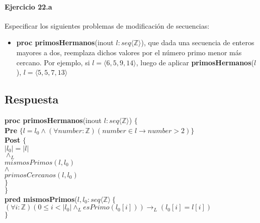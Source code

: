 \documentclass[a4paper]{article}
\begin{document}
\paragraph*{Ejercicio 22.a} Especificar los siguientes problemas de modificación de secuencias:
	\begin{itemize}
		\item \textbf{proc primosHermanos}(inout $l:seq\langle \mathbb{Z}\rangle$), que dada una secuencia de enteros mayores a dos, reemplaza dichos valores por el número primo menor más cercano. Por ejemplo, si $l=\langle 6,5,9,14 \rangle$, luego de aplicar \textbf{primosHermanos}($l$), $l=\langle 5,5,7,13 \rangle$
	\end{itemize}
	
\subsection*{Respuesta}
			
			\textbf{proc primosHermanos}(inout $l:seq\langle \mathbb{Z}\rangle$) $\{$\smallskip \\
			\hspace*{6mm} \textbf{Pre }$\{l=l_0 \wedge 
				(\forall number:\mathbb{Z})(number\in l \rightarrow
			 number>2)\}$\smallskip \\
			\hspace*{6mm} \textbf{Post }$\{$\\
			\hspace*{6mm} $|l_0|=|l|$\\
			\hspace*{6mm} $\wedge_L$\\
			\hspace*{6mm} $mismosPrimos(l,l_0 )$\\
			\hspace*{6mm} $\wedge$\\
			\hspace*{6mm} $primosCercanos(l,l_0)$\\
			\hspace*{6mm} $\}$\\
			\hspace*{5mm}$\}$\smallskip \\
			
			\textbf{pred mismosPrimos}($l,l_0: seq\langle\mathbb{Z}\rangle
			\ \{$\smallskip \\
			\hspace*{6mm}$(\forall i:\mathbb{Z})(0\leq i < |l_0|\wedge_L esPrimo(l_0[i]))
				\rightarrow_L(l_0[i]=l[i])$\\
			\hspace*{5mm}$\}$\smallskip \\
			
\end{document}
